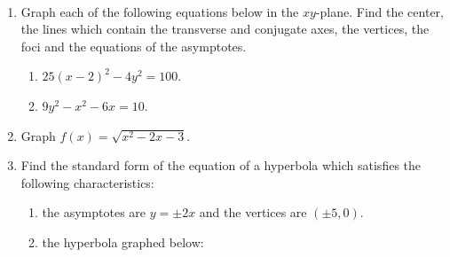 \documentclass{ximera}
\begin{document}
\begin{example} \label{hyperbolasfirstex} $~$

\begin{enumerate}

\item  Graph each of the following equations below in the $xy$-plane.  Find the center, the lines which contain the transverse and conjugate axes, the vertices, the foci and the equations of the asymptotes.

\begin{enumerate}

\item   $25(x-2)^2 - 4y^2 = 100$. 

\item \label{ctshyperbolaex}   $9y^2-x^2-6x=10$.

\end{enumerate}

\item  Graph $f(x) = \sqrt{x^2-2x-3}$.

\item  Find the standard form of the equation of a hyperbola  which satisfies the following characteristics:

\begin{enumerate}

\item  the asymptotes are $y= \pm 2x$ and the vertices are $(\pm 5,0)$.

\item  the hyperbola graphed below:

\begin{image}
\end{image}
\end{enumerate}
\end{enumerate}
\end{example}
\end{document}
